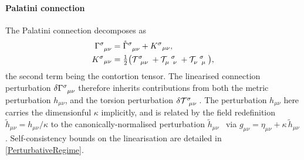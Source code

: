 \paragraph*{Palatini connection}
The Palatini connection
decomposes as~\cite{hehl1976spin,shapiro2002torsion,hehlobukhov2007cartan,blagojevic2003lectures}
\begin{subequations}
\label{PalatiniDecomposition}
\begin{align}
  \MAGA{^\sigma_\mu_\nu}
    &= \rCon{^\sigma_\mu_\nu} + K^\sigma{}_{\mu\nu}, \\
  K^\sigma{}_{\mu\nu}
    &= \tfrac{1}{2}\bigl(
        \MAGT{^\sigma_\mu_\nu}
        + \MAGT{_\mu^\sigma_\nu}
        + \MAGT{_\nu^\sigma_\mu}
      \bigr),
\end{align}
\end{subequations}
the second term being the contortion tensor. The linearised connection
perturbation $\delta\MAGA{^\sigma_\mu_\nu}$ therefore inherits
contributions from both the metric perturbation $h_{\mu\nu}$,
and the torsion perturbation
$\delta\MAGT{^\sigma_\mu_\nu}$.
The perturbation $h_{\mu\nu}$ here
carries the dimensionful $\kappa$ implicitly, and is related by the
field redefinition $\tilde{h}_{\mu\nu} = h_{\mu\nu}/\kappa$ to the
canonically-normalised perturbation
$\tilde{h}_{\mu\nu}$~\cite{lella2024constraining} via
$g_{\mu\nu} = \eta_{\mu\nu} + \kappa\,\tilde{h}_{\mu\nu}$.
Self-consistency bounds on the linearisation are detailed in
\cref{PerturbativeRegime}.

